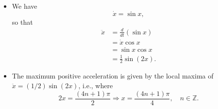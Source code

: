 
\begin{itemize}
  \item[(a)] We have
    \[
      \dot{x} = \sin{x},
    \]
    so that
    \begin{equation*}
      \begin{split}
        \ddot{x} &= \frac{d}{dt}(\sin{x}) \\
        &= \dot{x}\cos{x} \\
        &= \sin{x}\cos{x} \\
        &= \frac{1}{2}\sin{(2x)}.
      \end{split}
    \end{equation*}
  \item[(b)] The maximum positive acceleration is given by the local maxima of
    $\ddot{x} = (1/2)\sin{(2x)}$, i.e., where
    \[
      2x = \frac{(4n + 1)\pi}{2} \Rightarrow x = \frac{(4n + 1)\pi}{4},
      \quad n \in \mathbb{Z}.
    \]
\end{itemize}
